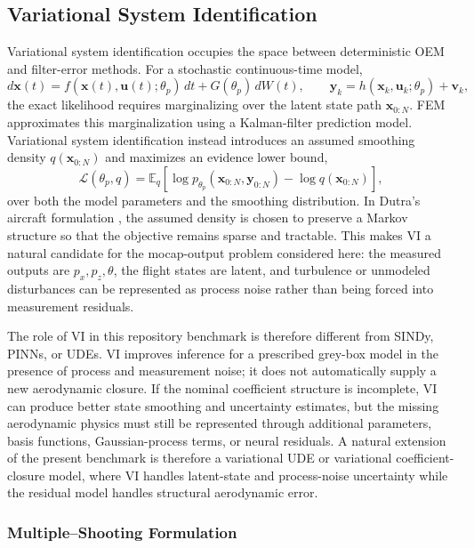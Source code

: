 \documentclass[11pt]{article}
\begin{document}
\subsection{Variational System Identification}
Variational system identification occupies the space between deterministic OEM and filter-error methods. For a stochastic continuous-time model,
\[
d\mathbf{x}(t)=f(\mathbf{x}(t),\mathbf{u}(t);\theta_p)\,dt+G(\theta_p)\,dW(t),
\qquad
\mathbf{y}_k=h(\mathbf{x}_k,\mathbf{u}_k;\theta_p)+\mathbf{v}_k,
\]
the exact likelihood requires marginalizing over the latent state path $\mathbf{x}_{0:N}$. FEM approximates this marginalization using a Kalman-filter prediction model. Variational system identification instead introduces an assumed smoothing density $q(\mathbf{x}_{0:N})$ and maximizes an evidence lower bound,
\[
\mathcal{L}(\theta_p,q)
=
\mathbb{E}_{q}
\left[
\log p_{\theta_p}(\mathbf{x}_{0:N},\mathbf{y}_{0:N})
-\log q(\mathbf{x}_{0:N})
\right],
\]
over both the model parameters and the smoothing distribution. In Dutra's aircraft formulation \citep{dutra_variational_2025}, the assumed density is chosen to preserve a Markov structure so that the objective remains sparse and tractable. This makes VI a natural candidate for the mocap-output problem considered here: the measured outputs are $p_x,p_z,\theta$, the flight states are latent, and turbulence or unmodeled disturbances can be represented as process noise rather than being forced into measurement residuals.

The role of VI in this repository benchmark is therefore different from SINDy, PINNs, or UDEs. VI improves inference for a prescribed grey-box model in the presence of process and measurement noise; it does not automatically supply a new aerodynamic closure. If the nominal coefficient structure is incomplete, VI can produce better state smoothing and uncertainty estimates, but the missing aerodynamic physics must still be represented through additional parameters, basis functions, Gaussian-process terms, or neural residuals. A natural extension of the present benchmark is therefore a variational UDE or variational coefficient-closure model, where VI handles latent-state and process-noise uncertainty while the residual model handles structural aerodynamic error.

\subsubsection{Multiple--Shooting Formulation}
\end{document}
